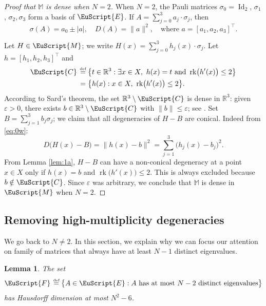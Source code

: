\documentclass[JEP,XML,SOM,Unicode,NoFloatCountersInSection]{cedram}
\let\pazocal\EuScript
\let\sep:
\newtheorem{lem}{Lemma}[section]
\theoremstyle{definition}
\DeclareMathOperator{\Id}{Id}
\DeclareMathOperator{\rk}{rk}
\newcommand{\FF}{\pazocal{F}}
\newcommand{\CC}{\pazocal{C}}
\newcommand{\EE}{\pazocal{E}}
\newcommand{\MM}{\pazocal{M}}
\newcommand{\R}{\mathbb{R}}
\newcommand{\Mm}{\mathbb{M}}
\let\epsi\varepsilon
\newcommand{\de}{\,\mathrel{\stackrel{\makebox[0pt]{\mbox{\normalfont\tiny def}}}{=}}}
\begin{document}
\begin{proof}[Proof that $\Mm$ is dense when $N=2$] When $N=2$, the Pauli matrices $\sigma_0 = \Id_2$, $\sigma_1$, $\sigma_2, \sigma_3$ form a basis of $\EE$. If $A = \sum_{j=0}^3 a_j \cdot \sigma_j$, then
\begin{equation}\label{eq:0w}
\sigma(A) = a_0 \pm |a|, \quad D(A) = \| a \|^2, \quad \text{where } a = [a_1,a_2,a_3]^\top.
\end{equation}

Let $H \in \MM$; we write $H(x) = \sum_{j=0}^3 h_j(x) \cdot \sigma_j$.
Let $h = [h_1,h_2,h_3]^\top$ and
\begin{align*}
\CC &\de \bigl\{ t \in \R^3\sep \exists x \in X, \ h(x) = t \text{ and } \rk \bigl(h'(x)\bigr) \leq 2 \bigr\} \\
&\,=
\bigl\{ h(x)\sep x \in X, \ \rk \bigl(h'(x)\bigr) \leq 2 \bigr\}.
\end{align*}
According to Sard's theorem, the set $\R^3 \setminus \CC$ is dense in $\R^3$: given $\epsi > 0$, there exists $b \in \R^3 \setminus \CC$ with $\| b \| \leq \epsi$; see \eg \cite[\S1.7]{GP74}. Set $B = \sum_{j=1}^3 b_j \sigma_j$; we claim that all degeneracies of $H-B$ are conical. Indeed from \eqref{eq:0w}:
\begin{equation*}
D\bigl(H(x) - B\bigr) = \big\| h(x) - b \big\|^2 = \sum_{j=1}^3 \bigl( h_j(x) -b_j \bigr)^2.
\end{equation*}
From Lemma \ref{lem:1a}, $H-B$ can have a non-conical degeneracy at a point $x \in X$ only if $h(x) = b$ and $\rk \bigl(h'(x)\bigr) \leq 2$. This is always excluded because $b \notin \CC$. Since $\epsi$ was arbitrary, we conclude that $\Mm$ is dense in $\MM$ when $N=2$. \end{proof}

\subsection{Removing high-multiplicity degeneracies}\label{sec:3.2} We go back to $N \neq 2$. In this section, we explain why we can focus our attention on family of matrices that always have at least $N-1$ distinct eigenvalues.

\begin{lem}\label{lem:1d} The set
\begin{equation*}
\FF \de \bigl\{ A \in \EE \sep A \text{ has at most $N-2$ distinct eigenvalues} \bigr\}
\end{equation*}
has Hausdorff dimension at most $N^2-6$.
\end{lem}
\end{document}
